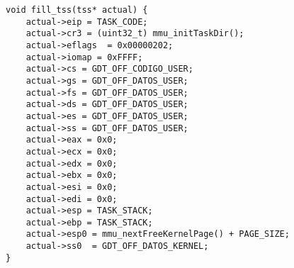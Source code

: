 \documentclass[10pt,landscape]{article}
\begin{document}
\begin{multicols*}{3}
\begin{verbatim}
void fill_tss(tss* actual) {
    actual->eip = TASK_CODE;
    actual->cr3 = (uint32_t) mmu_initTaskDir();
    actual->eflags  = 0x00000202;
    actual->iomap = 0xFFFF;
    actual->cs = GDT_OFF_CODIGO_USER;
    actual->gs = GDT_OFF_DATOS_USER;
    actual->fs = GDT_OFF_DATOS_USER;
    actual->ds = GDT_OFF_DATOS_USER;
    actual->es = GDT_OFF_DATOS_USER;
    actual->ss = GDT_OFF_DATOS_USER;
    actual->eax = 0x0;
    actual->ecx = 0x0;
    actual->edx = 0x0;
    actual->ebx = 0x0;
    actual->esi = 0x0;
    actual->edi = 0x0;
    actual->esp = TASK_STACK;
    actual->ebp = TASK_STACK;
    actual->esp0 = mmu_nextFreeKernelPage() + PAGE_SIZE;
    actual->ss0  = GDT_OFF_DATOS_KERNEL;
}
\end{verbatim}


\end{multicols*}
\end{document}
